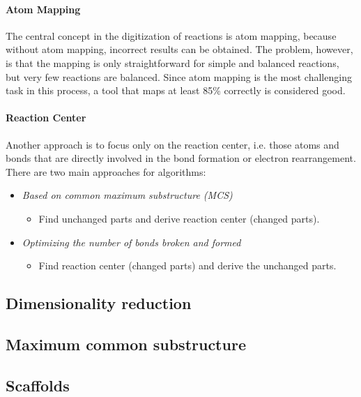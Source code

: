\paragraph{Atom Mapping}
The central concept in the digitization of reactions is atom mapping, because without atom mapping, incorrect results can be obtained. The problem, however, is that the mapping is only straightforward for simple and balanced reactions, but very few reactions are balanced. Since atom mapping is the most challenging task in this process, a tool that maps at least 85\% correctly is considered good.

\paragraph{Reaction Center}
Another approach is to focus only on the reaction center, i.e. those atoms and bonds that are directly involved in the bond formation or electron rearrangement. There are two main approaches for algorithms:

\begin{itemize}
    \item \emph{Based on common maximum substructure (MCS)}
    \begin{itemize}
        \item Find unchanged parts and derive reaction center (changed parts).
    \end{itemize}
    \item \emph{Optimizing the number of bonds broken and formed}
    \begin{itemize}
        \item Find reaction center (changed parts) and derive the unchanged parts.
    \end{itemize}
\end{itemize}

\subsection{Dimensionality reduction}

\subsection{Maximum common substructure}

\subsection{Scaffolds}


